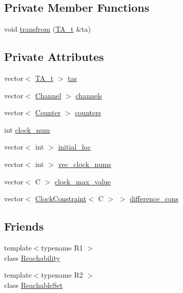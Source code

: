 \subsection*{Private Member Functions}
\begin{DoxyCompactItemize}
\item 
void \mbox{\hyperlink{classgraphsat_1_1_t_a_s_afb4c90a64550e06d839677bbc8d85d02}{transfrom}} (\mbox{\hyperlink{classgraphsat_1_1_t_a_s_a74d326d2d6c5868f7394bfd460544a3b}{T\+A\+\_\+t}} \&ta)
\end{DoxyCompactItemize}
\subsection*{Private Attributes}
\begin{DoxyCompactItemize}
\item 
vector$<$ \mbox{\hyperlink{classgraphsat_1_1_t_a_s_a74d326d2d6c5868f7394bfd460544a3b}{T\+A\+\_\+t}} $>$ \mbox{\hyperlink{classgraphsat_1_1_t_a_s_a34137871f2ec794eb7dab7a37f113e02}{tas}}
\item 
vector$<$ \mbox{\hyperlink{structgraphsat_1_1_channel}{Channel}} $>$ \mbox{\hyperlink{classgraphsat_1_1_t_a_s_a5d81d02db63026ccb83f363b8f93d006}{channels}}
\item 
vector$<$ \mbox{\hyperlink{classgraphsat_1_1_counter}{Counter}} $>$ \mbox{\hyperlink{classgraphsat_1_1_t_a_s_aaf1a710c6b2d55c546bd7e2d75a433fd}{counters}}
\item 
int \mbox{\hyperlink{classgraphsat_1_1_t_a_s_ab49d4437d37f18ac5a2019da27011a0f}{clock\+\_\+num}}
\item 
vector$<$ int $>$ \mbox{\hyperlink{classgraphsat_1_1_t_a_s_a3f3d799013aed8cf917c43d635fa3d20}{initial\+\_\+loc}}
\item 
vector$<$ int $>$ \mbox{\hyperlink{classgraphsat_1_1_t_a_s_a8ee222cb29cb149323caee831bc3fc9c}{vec\+\_\+clock\+\_\+nums}}
\item 
vector$<$ C $>$ \mbox{\hyperlink{classgraphsat_1_1_t_a_s_af2155a1d58a5358feb27129062178120}{clock\+\_\+max\+\_\+value}}
\item 
vector$<$ \mbox{\hyperlink{classgraphsat_1_1_clock_constraint}{Clock\+Constraint}}$<$ C $>$ $>$ \mbox{\hyperlink{classgraphsat_1_1_t_a_s_a61700cc59d694adefbe0a9b6a1e9acad}{difference\+\_\+cons}}
\end{DoxyCompactItemize}
\subsection*{Friends}
\begin{DoxyCompactItemize}
\item 
{\footnotesize template$<$typename R1 $>$ }\\class \mbox{\hyperlink{classgraphsat_1_1_t_a_s_ac274586d6140dff44fa1029371c2cf48}{Reachability}}
\item 
{\footnotesize template$<$typename R2 $>$ }\\class \mbox{\hyperlink{classgraphsat_1_1_t_a_s_a8e8eb523736892bc0c9b460e370db614}{Reachable\+Set}}
\end{DoxyCompactItemize}


